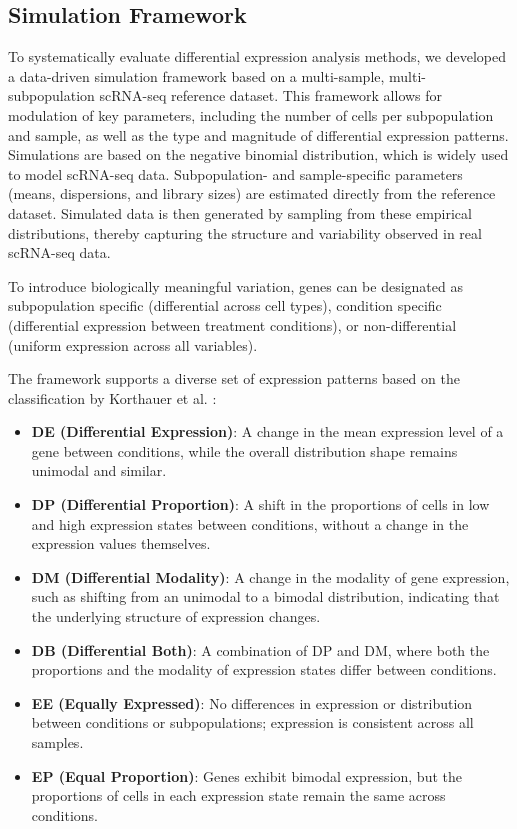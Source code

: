 \documentclass[a4paper, 11pt, twocolumn]{article}
\begin{document}
\begin{multicols}{2}
\subsection{Simulation Framework}

To systematically evaluate differential expression analysis methods, we developed a data-driven simulation framework based on a multi-sample, multi-subpopulation scRNA-seq reference dataset. This framework allows for modulation of key parameters, including the number of cells per subpopulation and sample, as well as the type and magnitude of differential expression patterns. Simulations are based on the negative binomial distribution, which is widely used to model scRNA-seq data. Subpopulation- and sample-specific parameters (means, dispersions, and library sizes) are estimated directly from the reference dataset. Simulated data is then generated by sampling from these empirical distributions, thereby capturing the structure and variability observed in real scRNA-seq data.

To introduce biologically meaningful variation, genes can be designated as subpopulation specific (differential across cell types), condition specific (differential expression between treatment conditions), or non-differential (uniform expression across all variables). 

The framework supports a diverse set of expression patterns based on the classification by Korthauer et al. \citep{korthauer2016statistical}:
\begin{itemize}[itemsep=1pt, topsep=1pt]
	\item \textbf{DE (Differential Expression)}: A change in the mean expression level of a gene between conditions, while the overall distribution shape remains unimodal and similar.
	\item \textbf{DP (Differential Proportion)}: A shift in the proportions of cells in low and high expression states between conditions, without a change in the expression values themselves.
	\item \textbf{DM (Differential Modality)}: A change in the modality of gene expression, such as shifting from an unimodal to a bimodal distribution, indicating that the underlying structure of expression changes.
	\item \textbf{DB (Differential Both)}: A combination of DP and DM, where both the proportions and the modality of expression states differ between conditions.
	\item \textbf{EE (Equally Expressed)}: No differences in expression or distribution between conditions or subpopulations; expression is consistent across all samples.
	\item \textbf{EP (Equal Proportion)}: Genes exhibit bimodal expression, but the proportions of cells in each expression state remain the same across conditions.
\end{itemize}


\end{multicols}
\end{document}
